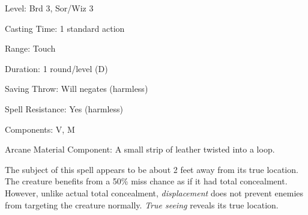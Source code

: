 
\begin{description*}
\item[Level:] Brd 3, Sor/Wiz 3
\item[Casting Time:] 1 standard action
\item[Range:] Touch
\item[Duration:] 1 round/level (D)
\item[Saving Throw:] Will negates (harmless)
\item[Spell Resistance:] Yes (harmless)
\item[Components:] V, M
\item[Arcane Material Component:] A small strip of leather twisted into a loop.
\end{description*}

The subject of this spell appears to be about 2 feet away from its true location.
The creature benefits from a 50\% miss chance as if it had total concealment. However,
unlike actual total concealment, \textit{displacement} does not prevent enemies
from targeting the creature normally. \textit{True seeing} reveals its true location.